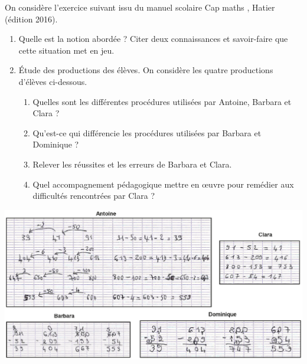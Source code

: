 \begin{exercice}[CRPE 2017 G3]
On considère l’exercice suivant issu du manuel scolaire \og Cap maths \fg, Hatier (édition 2016).
\begin{center}
\end{center}
\begin{enumerate}
   \item Quelle est la notion abordée ? Citer deux connaissances et savoir-faire que cette situation met en jeu.
   \item Étude des productions des élèves. On considère les quatre productions d’élèves ci-dessous.
   \begin{enumerate}
      \item Quelles sont les différentes procédures utilisées par Antoine, Barbara et Clara ?
      \item Qu’est-ce qui différencie les procédures utilisées par Barbara et Dominique ?
      \item Relever les réussites et les erreurs de Barbara et Clara.
      \item Quel accompagnement pédagogique mettre en \oe uvre pour remédier aux difficultés rencontrées par Clara ?  \\ [-8mm]
   \end{enumerate}
\end{enumerate}
\begin{center}
   \includegraphics[width=14.5cm]{Nombres_et_calculs_did/Images/Num3_analyse_soustractions}
\end{center}
\end{exercice}

